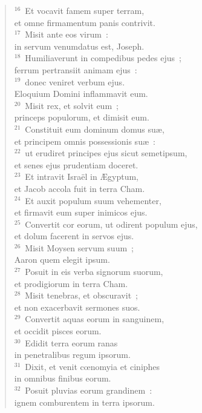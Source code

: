 \begin{flushleft}
\begin{verse}
${}^{16}$~Et vocavit famem super terram,\\ et omne firmamentum panis contrivit.\\
${}^{17}$~Misit ante eos virum~:\\ in servum venumdatus est, Joseph.\\
${}^{18}$~Humiliaverunt in compedibus pedes ejus~;\\ ferrum pertransiit animam ejus~:\\
${}^{19}$~donec veniret verbum ejus.\\ Eloquium Domini inflammavit eum.\\
${}^{20}$~Misit rex, et solvit eum~;\\ princeps populorum, et dimisit eum.\\
${}^{21}$~Constituit eum dominum domus su\ae ,\\ et principem omnis possessionis su\ae~:\\
${}^{22}$~ut erudiret principes ejus sicut semetipsum,\\ et senes ejus prudentiam doceret.\\
${}^{23}$~Et intravit Isra\"el in \AE gyptum,\\ et Jacob accola fuit in terra Cham.\\
${}^{24}$~Et auxit populum suum vehementer,\\ et firmavit eum super inimicos ejus.\\
${}^{25}$~Convertit cor eorum, ut odirent populum ejus,\\ et dolum facerent in servos ejus.\\
${}^{26}$~Misit Moysen servum suum~;\\ Aaron quem elegit ipsum.\\
${}^{27}$~Posuit in eis verba signorum suorum,\\ et prodigiorum in terra Cham.\\
${}^{28}$~Misit tenebras, et obscuravit~;\\ et non exacerbavit sermones suos.\\
${}^{29}$~Convertit aquas eorum in sanguinem,\\ et occidit pisces eorum.\\
${}^{30}$~Edidit terra eorum ranas\\ in penetralibus regum ipsorum.\\
${}^{31}$~Dixit, et venit cœnomyia et ciniphes\\ in omnibus finibus eorum.\\
${}^{32}$~Posuit pluvias eorum grandinem~:\\ ignem comburentem in terra ipsorum.\\

\end{verse}
\end{flushleft}
